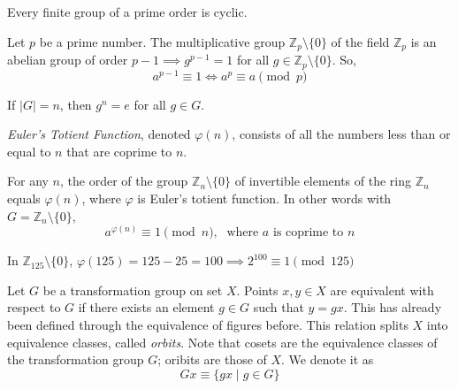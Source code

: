 \documentclass{article}
\begin{document}
    \begin{corollary}
      Every finite group of a prime order is cyclic. 
    \end{corollary}

    \begin{theorem}
      Let $p$ be a prime number. The multiplicative group $\mathbb{Z}_{p} \setminus \{0\}$ of the field $\mathbb{Z}_{p}$ is an abelian group of order $p-1 \implies g^{p-1} = 1$ for all $g \in \mathbb{Z}_{p} \setminus \{0\}$. So,
      \begin{equation}
        a^{p-1} \equiv 1 \iff a^{p} \equiv a \pmod{p}
      \end{equation}
    \end{theorem}

    \begin{corollary}
      If $|G| = n$, then $g^{n} = e$ for all $g \in G$. 
    \end{corollary}

    \begin{definition}
      \textit{Euler's Totient Function}, denoted $\varphi(n)$, consists of all the numbers less than or equal to $n$ that are coprime to $n$. 
    \end{definition}

    \begin{theorem}
      For any $n$, the order of the group $\mathbb{Z}_{n} \setminus \{0\}$ of invertible elements of the ring $\mathbb{Z}_{n}$ equals $\varphi(n)$, where $\varphi$ is Euler's totient function. In other words with $G = \mathbb{Z}_{n} \setminus \{0\}$, 
      \begin{equation}
        a^{\varphi(n)} \equiv 1 \pmod{n}, \; \text{ where $a$ is coprime to $n$}
      \end{equation}
    \end{theorem}

    \begin{example}
      In $\mathbb{Z}_{125} \setminus \{0\}$, $\varphi(125) = 125 - 25 = 100 \implies 2^{100} \equiv 1 \pmod{125}$
    \end{example}

    \begin{definition}
      Let $G$ be a transformation group on set $X$. Points $x, y \in X$ are equivalent with respect to $G$ if there exists an element $g \in G$ such that $y = g x$. This has already been defined through the equivalence of figures before. This relation splits $X$ into equivalence classes, called \textit{orbits}. Note that cosets are the equivalence classes of the transformation group $G$; oribits are those of $X$. We denote it as
      \begin{equation}
        Gx \equiv \{ g x \;|\;g \in G \}
      \end{equation}
    \end{definition}
\end{document}
